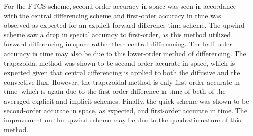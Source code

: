 \documentclass[twocolumn,10pt]{asme2ej}
\begin{document}
 \noindent For the FTCS scheme, second-order accuracy in space was seen in accordance with the central differencing scheme and first-order accuracy in time was observed as expected for an explicit forward difference time scheme.  The upwind scheme saw a drop in special accuracy to first-order, as this method utilized forward differencing in space rather than central differencing.  The half order accuracy in time may also be due to this lower-order method of differencing.  The trapezoidal method was shown to be second-order accurate in space, which is expected given that central differencing is applied to both the diffusive and the convective flux. However, the trapezoidal method is only first-order accurate in time, which is again due to the first-order difference in time of both of the averaged explicit and implicit schemes.  Finally, the quick scheme was shown to be second-order accurate in space, as expected, and first-order accurate in time.  The improvement on the upwind scheme may be due to the quadratic nature of this method.







\end{document}
